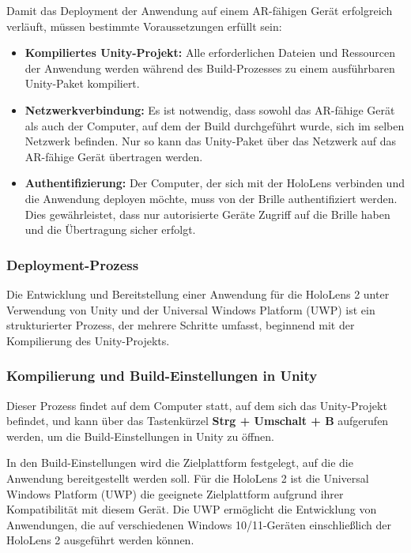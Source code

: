 Damit das Deployment der Anwendung auf einem AR-fähigen Gerät erfolgreich verläuft, müssen bestimmte Voraussetzungen erfüllt sein:

\begin{itemize}
    \item \textbf{Kompiliertes Unity-Projekt:} Alle erforderlichen Dateien und Ressourcen der Anwendung werden während des Build-Prozesses zu einem ausführbaren Unity-Paket kompiliert.

    \item \textbf{Netzwerkverbindung:} Es ist notwendig, dass sowohl das AR-fähige Gerät als auch der Computer, auf dem der Build durchgeführt wurde, sich im selben Netzwerk befinden. Nur so kann das Unity-Paket über das Netzwerk auf das AR-fähige Gerät übertragen werden.

    \item \textbf{Authentifizierung:} Der Computer, der sich mit der HoloLens verbinden und die Anwendung deployen möchte, muss von der Brille authentifiziert werden. Dies gewährleistet, dass nur autorisierte Geräte Zugriff auf die Brille haben und die Übertragung sicher erfolgt.
\end{itemize}

\subsubsection{Deployment-Prozess}

Die Entwicklung und Bereitstellung einer Anwendung für die HoloLens 2 unter Verwendung von Unity und der Universal Windows Platform (UWP) ist ein strukturierter Prozess, der mehrere Schritte umfasst, beginnend mit der Kompilierung des Unity-Projekts.

\subsubsection*{Kompilierung und Build-Einstellungen in Unity}
Dieser Prozess findet auf dem Computer statt, auf dem sich das Unity-Projekt befindet, und kann über das Tastenkürzel \textbf{Strg + Umschalt + B} aufgerufen werden, um die Build-Einstellungen in Unity zu öffnen.

In den Build-Einstellungen wird die Zielplattform festgelegt, auf die die Anwendung bereitgestellt werden soll. Für die HoloLens 2 ist die Universal Windows Platform (UWP) die geeignete Zielplattform aufgrund ihrer Kompatibilität mit diesem Gerät. Die UWP ermöglicht die Entwicklung von Anwendungen, die auf verschiedenen Windows 10/11-Geräten einschließlich der HoloLens 2 ausgeführt werden können. %

